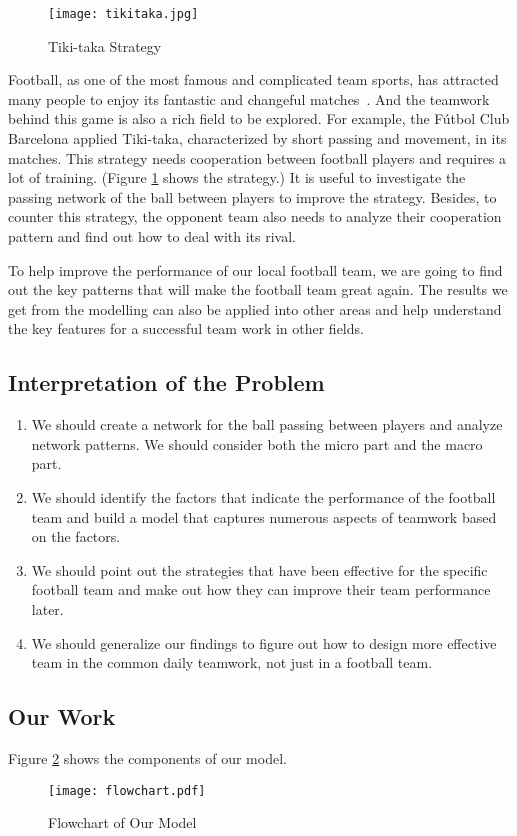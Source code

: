 \documentclass[12pt]{mcmthesis}
\begin{document}
	\begin{figure}[h]
		\centering
		\texttt{[image: tikitaka.jpg]}
		\caption{Tiki-taka Strategy~\cite{tikitaka}}\label{fig:tiki}
	\end{figure}
	Football, as one of the most famous and complicated team sports, has attracted many people to enjoy its fantastic and changeful matches~\cite{football}. And the teamwork behind this game is also a rich field to be explored. For example, the F\'utbol Club Barcelona applied Tiki-taka, characterized by short passing and movement, in its matches. This strategy needs cooperation between football players and requires a lot of training. (Figure \ref{fig:tiki} shows the strategy.) It is useful to investigate the passing network of the ball between players to improve the strategy. Besides, to counter this strategy, the opponent team also needs to analyze their cooperation pattern and find out how to deal with its rival.
	
	To help improve the performance of our local football team, we are going to find out the key patterns that will make the football team great again. The results we get from the modelling can also be applied into other areas and help understand the key features for a successful team work in other fields.
	
\subsection{Interpretation of the Problem}
\begin{enumerate}
	\item We should create a network for the ball passing between players and analyze network patterns. We should consider both the micro part and the macro part.
	\item We should identify the factors that indicate the performance of the football team and build a model that captures numerous aspects of teamwork based on the factors.
	\item We should point out the strategies that have been effective for the specific football team and make out how they can improve their team performance later.
	\item We should generalize our findings to figure out how to design more effective team in the common daily teamwork, not just in a football team.
\end{enumerate}

\subsection{Our Work}
Figure \ref{fig:ourwork} shows the components of our model.
\begin{figure}[h]
	\centering
	\texttt{[image: flowchart.pdf]}
	\caption{Flowchart of Our Model}
	\label{fig:ourwork}
\end{figure}
\end{document}
